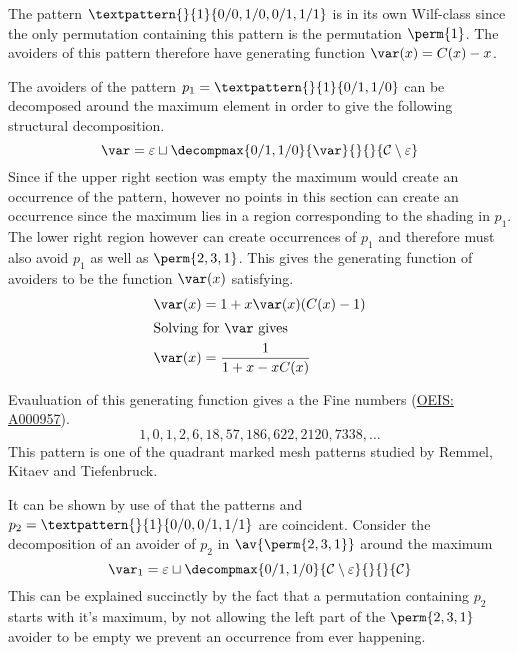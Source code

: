 The pattern \(\textpattern{}{1}{0/0,1/0,0/1,1/1}\) is in its own
Wilf-class since the only permutation containing this pattern is
the permutation \(\perm{1}\). The avoiders of this pattern therefore
have generating function \(\var(x) = C(x)-x\).\nextvar

The avoiders of the pattern \(p_1 = \textpattern{}{1}{0/1,1/0}\) can be
decomposed around the maximum element in order to give the following
structural decomposition.
\begin{equation*}
    \mathcal{\var} = \varepsilon \sqcup \decompmax{0/1,1/0}{\mathcal{\var}}{}{}{\mathcal{C}\setminus\varepsilon}
\end{equation*}
Since if the upper right section was empty the maximum would create an
occurrence of the pattern, however no points in this section can create
an occurrence since the maximum lies in a region corresponding to the
shading in \(p_1\). The lower right region however can create occurrences
of \(p_1\) and therefore must also avoid \(p_1\) as well as \(\perm{2,3,1}\).
This gives the generating function of avoiders to be the function \(\var(x)\)
satisfying.
\begin{align*}
    \var(x) &= 1 + x\var(x)(C(x)-1) \\
    \shortintertext{Solving for \(\var\) gives}
    \var(x) &= \frac{1}{1+x-xC(x)}
\end{align*}

Evauluation of this generating function gives a the Fine numbers
(\href{https://oeis.org/A000957}{OEIS: A000957}).
\begin{equation*}
    1, 0, 1, 2, 6, 18, 57, 186, 622, 2120, 7338,\dotsc
\end{equation*}
This pattern is one of the
quadrant marked mesh patterns studied by Remmel, Kitaev and Tiefenbruck\cite{2012arXiv1201.6243K}.

It can be shown by use of  that the patterns
 and \(p_2 = \textpattern{}{1}{0/0,0/1,1/1}\) are
coincident. Consider the decomposition of an avoider of \(p_2\) in
\(\av{\perm{2,3,1}}\) around the maximum\nextvar[\varullr]
\begin{equation*}
    \mathcal{\var}_1 =\varepsilon \sqcup \decompmax{0/1,1/0}{\mathcal{C}\setminus\varepsilon}{}{}{\mathcal{C}}
\end{equation*}
This can be explained succinctly by the fact that a permutation containing
\(p_2\) starts with it's maximum, by not allowing the left part of the
\(\perm{2,3,1}\) avoider to be empty we prevent an occurrence from ever happening.

